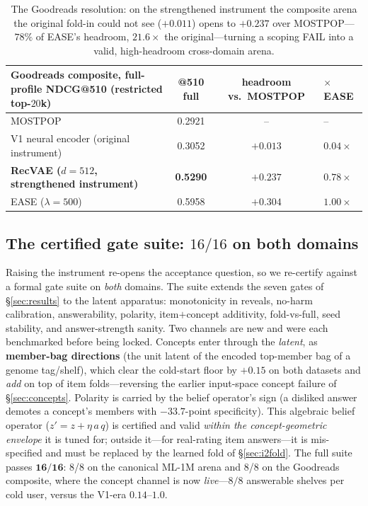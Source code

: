 \documentclass[11pt]{article}
\begin{document}
\begin{table}[h]\centering\small
\begin{tabular}{lccl}
\toprule
Goodreads composite, full-profile NDCG@510 (restricted top-$20$k) & @510 full & headroom vs.\ MOSTPOP & $\times$ EASE\\
\midrule
MOSTPOP & 0.2921 & -- & --\\
V1 neural encoder (original instrument) & 0.3052 & $+0.013$ & $0.04\times$\\
\textbf{RecVAE ($d{=}512$, strengthened instrument)} & \textbf{0.5290} & $\mathbf{+0.237}$ & $\mathbf{0.78\times}$\\
EASE ($\lambda{=}500$) & 0.5958 & $+0.304$ & $1.00\times$\\
\bottomrule
\end{tabular}
\caption{The Goodreads resolution: on the strengthened instrument the composite arena the original fold-in could not see
($+0.011$) opens to $+0.237$ over MOSTPOP---$78\%$ of EASE's headroom, $21.6\times$ the original---turning a scoping FAIL
into a valid, high-headroom cross-domain arena.}
\label{tab:i2gr}
\end{table}

\subsection{The certified gate suite: $16/16$ on both domains}\label{sec:i2gates}
Raising the instrument re-opens the acceptance question, so we re-certify against a formal gate suite on \emph{both}
domains. The suite extends the seven gates of \S\ref{sec:results} to the latent apparatus: monotonicity in reveals,
no-harm calibration, answerability, polarity, item$+$concept additivity, fold-vs-full, seed stability, and
answer-strength sanity. Two channels are new and were each benchmarked before being locked. Concepts enter through the
\emph{latent}, as \textbf{member-bag directions} (the unit latent of the encoded top-member bag of a genome tag/shelf),
which clear the cold-start floor by $+0.15$ on both datasets and \emph{add} on top of item folds---reversing the earlier
input-space concept failure of \S\ref{sec:concepts}. Polarity is carried by the belief operator's sign (a disliked
answer demotes a concept's members with $-33.7$-point specificity). This algebraic belief operator
($z'=z+\eta\,a\,q$) is certified and valid \emph{within the concept-geometric envelope} it is tuned for;
outside it---for real-rating item answers---it is mis-specified and must be replaced by the learned fold of
\S\ref{sec:i2fold}. The full suite passes $\mathbf{16/16}$: 8/8 on the
canonical ML-1M arena and 8/8 on the Goodreads composite, where the concept channel is now \emph{live}---$8/8$
answerable shelves per cold user, versus the V1-era $0.14$--$1.0$.
\end{document}
